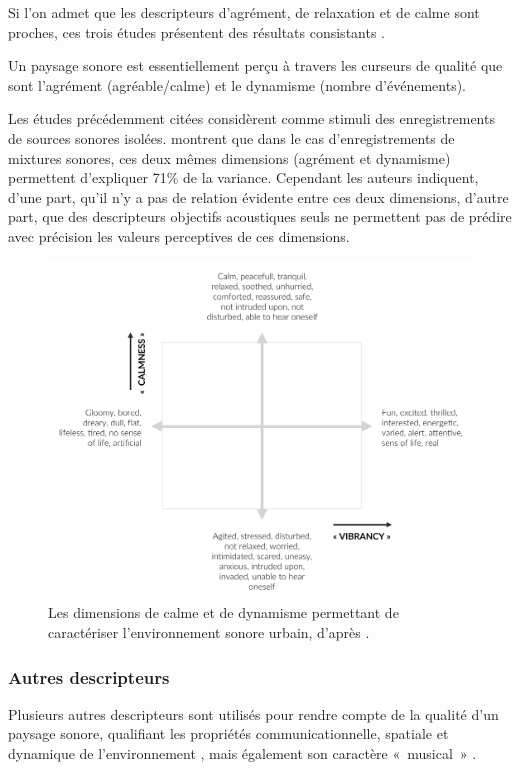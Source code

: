 Si l'on admet que les descripteurs d'agrément, de relaxation et de calme sont proches, ces trois études présentent des résultats consistants \citep{davies2013perception}. 

Un paysage sonore est essentiellement perçu à travers les curseurs de qualité que sont l'agrément (agréable/calme) et le dynamisme (nombre d'événements).
 
Les études précédemment citées considèrent comme stimuli des enregistrements de sources sonores isolées. \citep{hall2013exploratory} montrent que dans le cas d'enregistrements de mixtures sonores, ces deux mêmes dimensions (agrément et dynamisme) permettent d'expliquer 71\% de la variance. Cependant les auteurs indiquent, d'une part, qu'il n'y a pas de relation évidente entre ces deux dimensions, d'autre part, que des descripteurs objectifs acoustiques seuls ne permettent pas de prédire avec précision les valeurs perceptives de ces dimensions.
 
\begin{figure}[t]
        \myfloatalign
        \includegraphics[width=.8\linewidth]{gfx/ch_3/calmVibran}
        \caption[Les dimensions de calme et de dynamisme permettant de caractériser l'environnement sonore urbain.]{Les dimensions de calme et de dynamisme permettant de caractériser l'environnement sonore urbain, d'après \citep{cain2013development}.}\label{fig:calmVibran}
\end{figure}

\subsubsection{Autres descripteurs}

Plusieurs autres descripteurs sont utilisés pour rendre compte de la qualité d'un paysage sonore, qualifiant les propriétés communicationnelle, spatiale et dynamique de l'environnement \citep{kang2010semantic}, mais également son caractère «~musical~» \citep{botteldooren2006temporal}.

